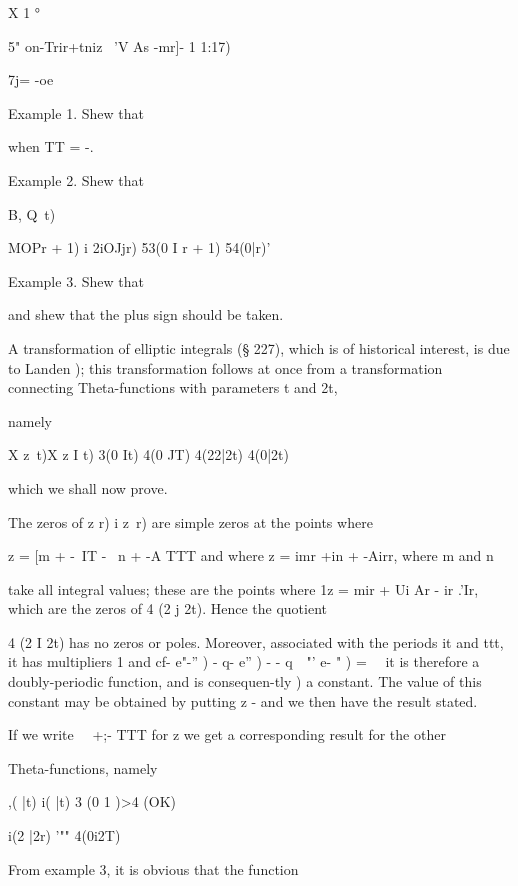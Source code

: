 X 1 °

5" on-Trir+tniz \ 'V As -mr]- 1 1:17)

7j= -oe

Example 1. Shew that

when TT = -.

Example 2. Shew that

B, Q\ t) \ %

MOPr + 1) i 2iOJjr) 53(0 I r + 1) 54(0|r)'

Example 3. Shew that

and shew that the plus sign should be taken.


A transformation of elliptic integrals (§ 227), which is of historical
interest, is due to Landen ); this transformation follows at
once from a transformation connecting Theta-functions with parameters
t and 2t,

namely

X z\ t)X z I t) 3(0 It) 4(0 JT) 4(22|2t) 4(0|2t)

which we shall now prove.

The zeros of z r) i z\ r) are simple zeros at the points where

z = [m + -\ IT - \ n + -A TTT and where z = imr +in + -Airr, where m
and n

%
%

take all integral values; these are the points where 1z = mir + Ui Ar
- ir .'Ir, which are the zeros of 4 (2 j 2t). Hence the quotient

 4 (2 I 2t) has no zeros or poles. Moreover, associated with the
periods it and ttt, it has multipliers 1 and cf- e"-'' ) - q- e'' ) -
- q~~"' e- " ) = \ \ it is therefore a doubly-periodic function, and
is consequen-tly ) a constant. The value of this constant may
be obtained by putting z - and we then have the result stated.

If we write \ \ +;- TTT for z we get a corresponding result for the
other

Theta-functions, namely

,( |t) i( |t) 3 (0 1 )>4 (OK)

 i(2 |2r) '"" 4(0i2T)

From  example 3, it is obvious that the
function


